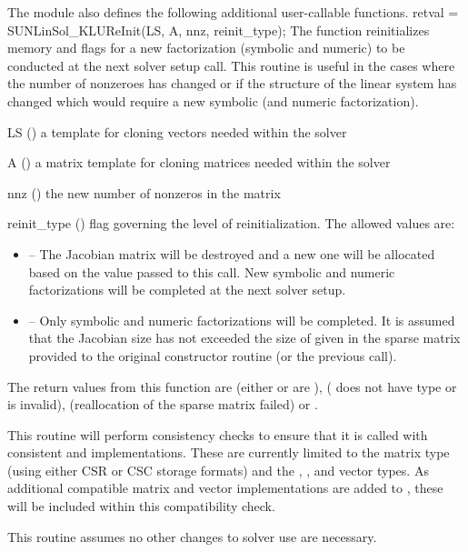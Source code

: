 The {\sunlinsolklu} module also defines the following additional
user-callable functions.
%
%
{
  retval = SUNLinSol\_KLUReInit(LS, A, nnz, reinit\_type);
}
{
  The function  reinitializes memory and
  flags for a new factorization (symbolic and numeric) to be conducted
  at the next solver setup call.  This routine is useful in the cases
  where the number of nonzeroes has changed or if the structure of the
  linear system has changed which would require a new symbolic (and
  numeric factorization). 
}
{
  \begin{args}
  \item[LS] ()
    a template for cloning vectors needed within the solver
  \item[A] ()
    a {\sunmatsparse} matrix template for cloning matrices needed
    within the solver 
  \item[nnz] ()
    the new number of nonzeros in the matrix
  \item[reinit\_type] ()
    flag governing the level of reinitialization.  The allowed values
    are:
    \begin{itemize}
    \item {} -- The Jacobian matrix will be
      destroyed and a new one will be allocated based on the 
      value passed to this call.  New symbolic and numeric
      factorizations will be completed at the next solver setup. 
    \item {} -- Only symbolic and numeric 
      factorizations will be completed.  It is assumed that the
      Jacobian size has not exceeded the size of  given in the
      sparse matrix provided to the original constructor routine (or
      the previous  call). 
    \end{itemize}
  \end{args}
}
{
  The return values from this function are 
  (either  or  are ), 
  ( does not have type  or
   is invalid),  (reallocation
  of the sparse matrix failed) or .
}
{
  This routine will perform consistency checks to ensure that it is
  called with consistent {\nvector} and {\sunmatrix} implementations.
  These are currently limited to the {\sunmatsparse} matrix type
  (using either CSR or CSC storage formats) and the {\nvecs},
  {\nvecopenmp}, and {\nvecpthreads} vector types.  As additional
  compatible matrix and vector implementations are added to
  {\sundials}, these will be included within this compatibility
  check.

  This routine assumes no other changes to solver use are necessary.
}
